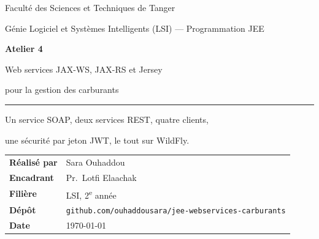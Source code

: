 \documentclass[11pt,a4paper]{article}
\begin{document}
\begin{titlepage}
  \thispagestyle{empty}
  \vspace*{0.6cm}
  {\color{white}\Large Faculté des Sciences et Techniques de Tanger\par}
  {\color{white}\large Génie Logiciel et Systèmes Intelligents (LSI) --- Programmation JEE\par}
  \vspace{3.6cm}
  {\color{teal}\fontsize{28}{34}\selectfont\bfseries Atelier 4\par}
  \vspace{0.4cm}
  {\color{ink}\fontsize{20}{26}\selectfont Web services JAX-WS, JAX-RS et Jersey\par}
  {\color{ink}\fontsize{20}{26}\selectfont pour la gestion des carburants\par}
  \vspace{0.8cm}
  {\color{saffron}\rule{6cm}{2pt}\par}
  \vspace{0.8cm}
  {\large Un service SOAP, deux services REST, quatre clients,\par
   une sécurité par jeton JWT, le tout sur WildFly.\par}
  \vfill
  \begin{tabular}{@{}ll@{}}
    \textbf{Réalisé par} & Sara Ouhaddou\\[0.3em]
    \textbf{Encadrant} & Pr.\ Lotfi Elaachak\\[0.3em]
    \textbf{Filière} & LSI, 2\textsuperscript{e} année\\[0.3em]
    \textbf{Dépôt} & \texttt{github.com/ouhaddousara/jee-webservices-carburants}\\[0.3em]
    \textbf{Date} & \today
  \end{tabular}
\end{titlepage}

\tableofcontents
\clearpage

\end{document}
